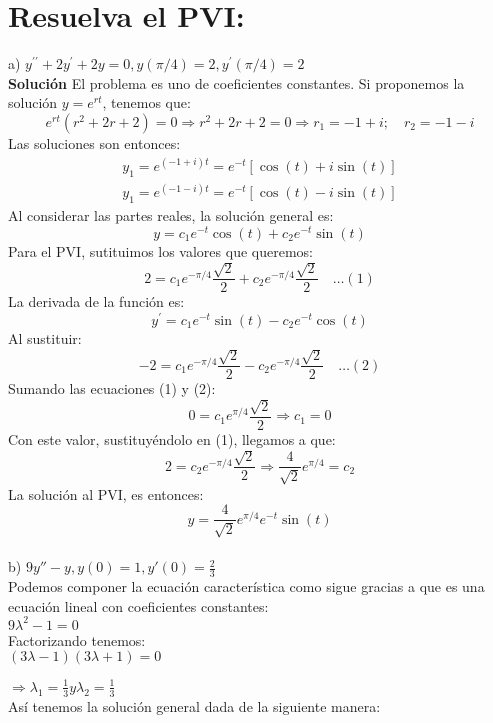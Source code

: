 \section{Resuelva el PVI:}

a) $y^{\prime \prime}+2 y^{\prime}+2 y=0, y(\pi / 4)=2, y^{\prime}(\pi / 4)=2$\\

\textbf{Solución} El problema es uno de coeficientes constantes. Si proponemos la solución $y=e^{r t}$, tenemos que:
$$
e^{r t}\left(r^{2}+2 r+2\right)=0 \Rightarrow r^{2}+2 r+2=0 \Rightarrow r_{1}=-1+i ; \quad r_{2}=-1-i
$$
Las soluciones son entonces:
$$
\begin{array}{l}
y_{1}=e^{(-1+i) t}=e^{-t}[\cos (t)+i \sin (t)] \\
y_{1}=e^{(-1-i) t}=e^{-t}[\cos (t)-i \sin (t)]
\end{array}
$$
Al considerar las partes reales, la solución general es:
$$
y=c_{1} e^{-t} \cos (t)+c_{2} e^{-t} \sin (t)
$$
Para el PVI, sutituimos los valores que queremos:
$$
2=c_{1} e^{-\pi / 4} \frac{\sqrt{2}}{2}+c_{2} e^{-\pi / 4} \frac{\sqrt{2}}{2} \quad \ldots(1)
$$
La derivada de la función es:
$$
y^{\prime}=c_{1} e^{-t} \sin (t)-c_{2} e^{-t} \cos (t)
$$
Al sustituir:
$$
-2=c_{1} e^{-\pi / 4} \frac{\sqrt{2}}{2}-c_{2} e^{-\pi / 4} \frac{\sqrt{2}}{2} \quad \ldots(2)
$$
Sumando las ecuaciones (1) y (2):
$$
0=c_{1} e^{\pi / 4} \frac{\sqrt{2}}{2} \Rightarrow c_{1}=0
$$
Con este valor, sustituyéndolo en (1), llegamos a que:
$$
2=c_{2} e^{-\pi / 4} \frac{\sqrt{2}}{2} \Rightarrow \frac{4}{\sqrt{2}} e^{\pi / 4}=c_{2}
$$
La solución al PVI, es entonces:
$$
y=\frac{4}{\sqrt{2}} e^{\pi / 4} e^{-t} \sin (t)
$$\\

b) $9y''-y, y(0)= 1, y'(0)= \frac{2}{3}$\\

Podemos componer la ecuación característica como sigue gracias a que es una ecuación lineal con coeficientes constantes:\\

$9 \lambda^{2}-1= 0$\\

Factorizando tenemos:\\

$(3 \lambda -1)(3\lambda +1)=0$

$\Rightarrow \lambda_{1}= \frac{1}{3} y \lambda_{2}= \frac{1}{3}$\\

Así tenemos la solución general dada de la siguiente manera: 


